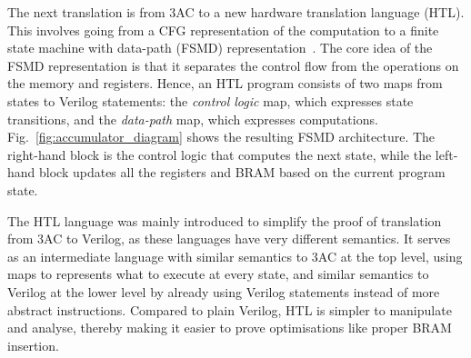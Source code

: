 The next translation is from 3AC to a new hardware translation language (HTL). %
This involves going from a CFG representation of the computation to a finite state machine with data-path (FSMD) representation~\cite{hwang99_fsmd}. The core idea of the FSMD representation is that it separates the control flow from the operations on the memory and registers. %
Hence, an HTL program consists of two maps from states to Verilog statements: the \emph{control logic} map, which expresses state transitions, and the \emph{data-path} map, which expresses computations.
Fig.~\ref{fig:accumulator_diagram} shows the resulting FSMD architecture. The right-hand block is the control logic that computes the next state, while the left-hand block updates all the registers and \gls{BRAM} based on the current program state.

The HTL language was mainly introduced to simplify the proof of translation from 3AC to Verilog, as these languages have very different semantics.
It serves as an intermediate language with similar semantics to 3AC at the top level, using maps to represents what to execute at every state, and similar semantics to Verilog at the lower level by already using Verilog statements instead of more abstract instructions.
Compared to plain Verilog, HTL is simpler to manipulate and analyse, thereby making it easier to prove optimisations like proper \gls{BRAM} insertion.

